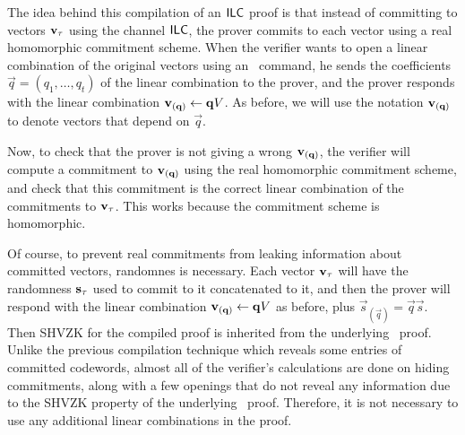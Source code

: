 The idea behind this compilation of an $\mathsf{ILC}$ proof is that instead of committing to vectors ${\mathbf{v}}_\tau$ using the channel $\mathsf{ILC}$, the prover commits to each vector using a real homomorphic commitment scheme. When the verifier wants to open a linear combination of the original vectors using an \ILCopen\ command, he sends the coefficients $\vec{q}=(q_1,\ldots,q_t)$ of the linear combination to the prover, and the prover responds with the linear combination ${\mathbf{v}}_{(\mathbf{q})}\gets \mathbf{q} V$.
As before, we will use the notation ${\mathbf{v}}_{(\mathbf{q})}$ to denote vectors that depend on $\vec{q}$.

Now, to check that the prover is not giving a wrong ${\mathbf{v}}_{(\mathbf{q})}$, the verifier will compute a commitment to ${\mathbf{v}}_{(\mathbf{q})}$ using the real homomorphic commitment scheme, and check that this commitment is the correct linear combination of the commitments to ${\mathbf{v}}_\tau$. This works because the commitment scheme is homomorphic.

Of course, to prevent real commitments from leaking information about committed vectors, randomnes is necessary. Each vector ${\mathbf{v}}_\tau$ will have the randomness $\mathbf{s}_\tau$ used to commit to it concatenated to it, and then the prover will respond with the linear combination ${\mathbf{v}}_{(\mathbf{q})}\gets \mathbf{q} V$ as before, plus $\vec{s}_{(\vec{q})}=\vec{q}\vec{s}$. Then SHVZK for the compiled proof is inherited from the underlying \ILC\ proof. Unlike the previous compilation technique which reveals some entries of committed codewords, almost all of the verifier's calculations are done on hiding commitments, along with a few openings that do not reveal any information due to the SHVZK property of the underlying \ILC\ proof. Therefore, it is not necessary to use any additional linear combinations in the proof.

